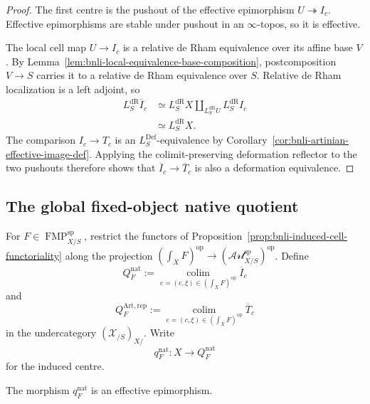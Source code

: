 \begin{proof}
The first centre is the pushout of the effective epimorphism
$U\twoheadrightarrow I_c$.  Effective epimorphisms are stable under pushout in
an $\infty$-topos, so it is effective.

The local cell map $U\to I_c$ is a relative de Rham equivalence over its
affine base $V$.  By
Lemma~\ref{lem:bnli-local-equivalence-base-composition}, postcomposition
$V\to S$ carries it to a relative de Rham equivalence over $S$.  Relative de
Rham localization is a left adjoint, so
\[
\begin{aligned}
    L_S^{\mathrm{dR}}\overline I_c
    &\simeq
    L_S^{\mathrm{dR}}X
    \amalg_{L_S^{\mathrm{dR}}U}
    L_S^{\mathrm{dR}}I_c\\
    &\simeq
    L_S^{\mathrm{dR}}X.
\end{aligned}
\]
The comparison $I_c\to T_c$ is an $L_S^{\mathrm{Def}}$-equivalence by
Corollary~\ref{cor:bnli-artinian-effective-image-def}.  Applying the
colimit-preserving deformation reflector to the two pushouts therefore shows
that $\overline I_c\to\overline T_c$ is also a deformation equivalence.
\end{proof}

\subsection{The global fixed-object native quotient}

\begin{definition}
\label{def:bnli-global-native-quotient}
For $F\in\operatorname{FMP}^{\mathrm{sp}}_{X/S}$, restrict the functors of
Proposition~\ref{prop:bnli-induced-cell-functoriality} along the projection
$(\int_XF)^{\mathrm{op}}\to
(\mathscr{Art}^{\mathrm{sp}}_{X/S})^{\mathrm{op}}$.  Define
\[
\boxed{
    Q_F^{\mathrm{nat}}
    :=
    \operatorname*{colim}_{e=(c,\xi)\in(\int_XF)^{\mathrm{op}}}
    \overline I_c}
\]
and
\[
\boxed{
    Q_F^{\mathrm{Art,rep}}
    :=
    \operatorname*{colim}_{e=(c,\xi)\in(\int_XF)^{\mathrm{op}}}
    \overline T_c}
\]
in the undercategory $(\mathcal X_{/S})_{X/}$.  Write
\[
    q_F^{\mathrm{nat}}:
    X\longrightarrow Q_F^{\mathrm{nat}}
\]
for the induced centre.
\end{definition}

\begin{proposition}
\label{prop:bnli-native-centre-effective}
The morphism $q_F^{\mathrm{nat}}$ is an effective epimorphism.
\end{proposition}

